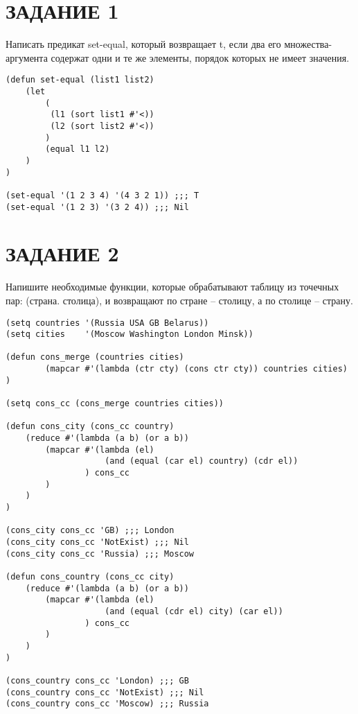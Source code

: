 \section{ЗАДАНИЕ 1}

Написать предикат set-equal, который возвращает t, если два
его множества-аргумента содержат одни и те же элементы,
порядок которых не имеет значения.

\begin{lstlisting}
(defun set-equal (list1 list2)
    (let
        (
         (l1 (sort list1 #'<))
         (l2 (sort list2 #'<))
        )
        (equal l1 l2)
    )
)

(set-equal '(1 2 3 4) '(4 3 2 1)) ;;; T
(set-equal '(1 2 3) '(3 2 4)) ;;; Nil
\end{lstlisting}

\section{ЗАДАНИЕ 2}

Напишите необходимые функции, которые обрабатывают
таблицу из точечных пар: (страна. столица), и возвращают по
стране -- столицу, а по столице -- страну.

\begin{lstlisting}
(setq countries '(Russia USA GB Belarus))
(setq cities    '(Moscow Washington London Minsk))

(defun cons_merge (countries cities)
        (mapcar #'(lambda (ctr cty) (cons ctr cty)) countries cities)
)

(setq cons_cc (cons_merge countries cities))

(defun cons_city (cons_cc country)
    (reduce #'(lambda (a b) (or a b))
        (mapcar #'(lambda (el)
                    (and (equal (car el) country) (cdr el))
                ) cons_cc
        )
    )
)

(cons_city cons_cc 'GB) ;;; London
(cons_city cons_cc 'NotExist) ;;; Nil
(cons_city cons_cc 'Russia) ;;; Moscow

(defun cons_country (cons_cc city)
    (reduce #'(lambda (a b) (or a b))
        (mapcar #'(lambda (el)
                    (and (equal (cdr el) city) (car el))
                ) cons_cc
        )
    )
)

(cons_country cons_cc 'London) ;;; GB
(cons_country cons_cc 'NotExist) ;;; Nil
(cons_country cons_cc 'Moscow) ;;; Russia
\end{lstlisting}

